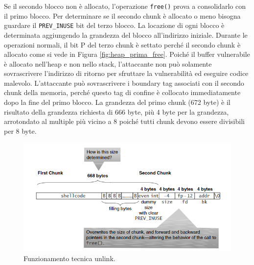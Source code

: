 Se il secondo blocco non è allocato, l'operazione \verb|free()| prova a consolidarlo
con il primo blocco. Per determinare se il secondo chunk è allocato o meno bisogna
guardare il \verb|PREV_INUSE| bit del terzo blocco. La locazione di ogni blocco è
determinata aggiungendo la grandezza del blocco all'indirizzo iniziale.
Durante le operazioni normali, il bit P del terzo chunk è settato perché il secondo
chunk è allocato come si vede in Figura \ref{fig:heap_prima_free}.
Poiché il buffer vulnerabile è allocato nell'heap e non nello stack, l'attaccante non
può solamente sovrascrivere l'indirizzo di ritorno per sfruttare la vulnerabilità ed
eseguire codice malevolo. L'attaccante può sovrascrivere i boundary tag associati
con il secondo chunk della memoria, perché questo tag di confine è collocato
immediatamente dopo la fine del primo blocco. La grandezza del primo chunk (672 byte)
è il risultato della grandezza richiesta di 666 byte, più 4 byte per la grandezza,
arrotondato al multiple più vicino a 8 poiché tutti chunk devono essere divisibili
per 8 byte.

\begin{figure}[H]
    \centering
    \includegraphics[width=13cm, keepaspectratio]{capitoli/secure_coding/img/cap_4/funzionamento_unlink.png}
    \caption{Funzionamento tecnica unlink.}\label{fig:funzionamento_unlink}
\end{figure}


